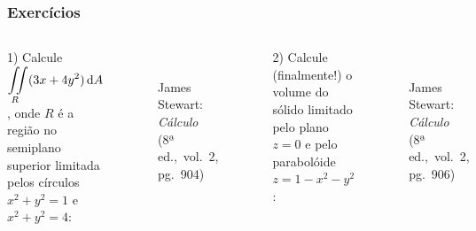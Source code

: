 \documentclass[pdftex, brazil, aspectratio=169]{beamer}
\newcommand*\diff{\mathop{}\!\mathrm{d}}
\begin{document}
\begin{frame}
  \frametitle{Exercícios}
  
  \begin{columns}
    1) Calcule $\displaystyle \iint\displaylimits_R (3x+4y^2) \diff A$, onde $R$ é a
    região no semiplano superior limitada pelos círculos $x^2 + y^2 =
    1$ e $x^2 + y^2 = 4$:
  \begin{figure}[H]
    \begin{center}
      \label{fig:int2-32}
      \\
      \footnotesize{James Stewart: \emph{Cálculo}\\ (8ª ed.,\ vol.\ 2, pg.\ 904)}
    \end{center}
  \end{figure}
  
    2) Calcule (finalmente!) o volume do sólido limitado pelo plano $z
    = 0$ e pelo parabolóide $z = 1 - x^2 - y^2$:
  \begin{figure}[H]
    \begin{center}
      \label{fig:int2-07c}
      \\
      \footnotesize{James Stewart: \emph{Cálculo}\\ (8ª ed.,\ vol.\ 2, pg.\ 906)}
    \end{center}
  \end{figure}
  
  \end{columns}
\end{frame}
\end{document}
